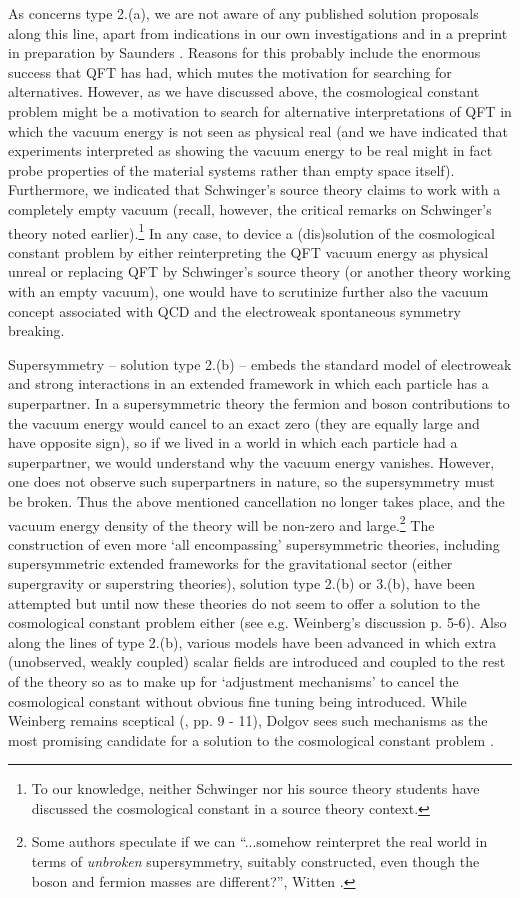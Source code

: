 \documentclass[12pt]{article}
\begin{document}
As concerns type 2.(a), we are not aware of any published solution
proposals along this line, apart from indications in our own
investigations \cite{rugh96,rugh98} and in a preprint in
preparation by Saunders \cite{saunders99}. Reasons for this
probably include the enormous success that QFT has had, which
mutes the motivation for searching for alternatives. However, as
we have discussed above, the cosmological constant problem might
be a motivation to search for alternative interpretations of QFT
in which the vacuum energy is not seen as physical real (and we
have indicated that experiments interpreted as showing the vacuum
energy to be real might in fact probe properties of the material
systems rather than empty space itself). Furthermore, we indicated
that Schwinger's source theory claims to work with a completely
empty vacuum (recall, however, the critical remarks on Schwinger's
theory noted earlier).\footnote{To our knowledge, neither
Schwinger nor his source theory students have discussed the
cosmological constant in a source theory context.} In any case, to
device a (dis)solution of the cosmological constant problem by
either reinterpreting the QFT vacuum energy as physical unreal or
replacing QFT by Schwinger's source theory (or another theory
working with an empty vacuum), one would have to scrutinize
further also the vacuum concept associated with QCD and the
electroweak spontaneous symmetry breaking.

Supersymmetry -- solution type 2.(b) -- embeds the standard model
of electroweak and strong interactions in an extended framework in
which each particle has a superpartner. In a supersymmetric theory
the fermion and boson contributions to the vacuum energy would
cancel to an exact zero (they are equally large and
have opposite sign), so if we lived in a world in which each
particle had a superpartner, we would understand why the vacuum
energy vanishes. However, one does not observe such
superpartners in nature, so the supersymmetry must be broken. Thus
the above mentioned cancellation no longer takes place, and the
vacuum energy density of the theory will be non-zero and
large.\footnote{Some authors speculate if we can ``...somehow
reinterpret the real world in terms of {\em unbroken}
supersymmetry, suitably constructed, even though the boson and
fermion masses are different?'', Witten \cite{witten00}.} The
construction of even more `all encompassing' supersymmetric
theories, including supersymmetric extended frameworks for the
gravitational sector (either supergravity or superstring
theories), solution type 2.(b) or 3.(b), have been attempted but
until now these theories do not seem to offer a solution to the
cosmological constant problem either (see e.g. Weinberg's
discussion \cite{Weinberg89} p. 5-6). Also along the lines of
type 2.(b), various models have been advanced in which extra 
(unobserved, weakly coupled) scalar fields
are introduced and coupled to the rest of the theory so as to make
up for `adjustment mechanisms' to cancel the cosmological constant
without obvious fine tuning being introduced. While Weinberg
remains sceptical (\cite{Weinberg89}, pp. 9 - 11), Dolgov sees
such mechanisms as the most promising candidate for a solution to
the cosmological constant problem \cite{dolgov97}. 
\end{document}
